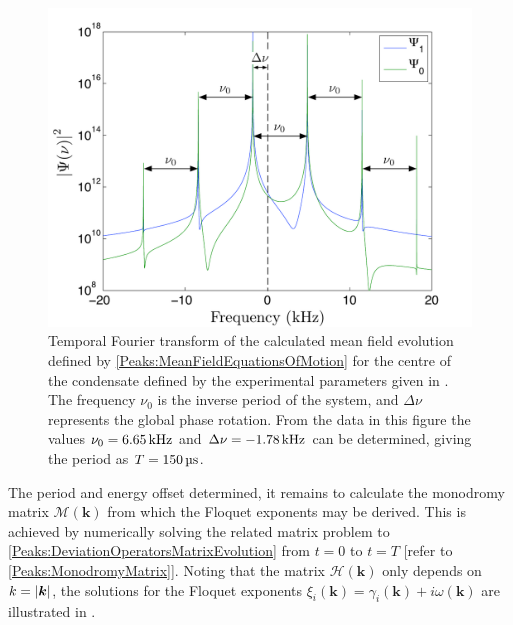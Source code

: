 \begin{figure}
    \centering
    \includegraphics[width=14cm]{MeanFieldFourierTransform}
    \caption{\label{Peaks:MeanFieldFourierTransform} Temporal Fourier transform of the calculated mean field evolution defined by \eqref{Peaks:MeanFieldEquationsOfMotion} for the centre of the condensate defined by the experimental parameters given in . The frequency $\nu_0$ is the inverse period of the system, and $\Delta\nu$ represents the global phase rotation. From the data in this figure the values $\nu_0 = \unit[6.65]{kHz}$ and $\Delta\nu = \unit[-1.78]{kHz}$ can be determined, giving the period as $T=\unit[150]{\micro{}s}$.}
\end{figure}

The period and energy offset determined, it remains to calculate the mono\-dromy matrix $\mathcal{M}(\bm{k})$ from which the Floquet exponents may be derived. This is achieved by numerically solving the related matrix problem to \eqref{Peaks:DeviationOperatorsMatrixEvolution} from $t=0$ to $t=T$ [refer to \eqref{Peaks:MonodromyMatrix}]. Noting that the matrix $\mathcal{H}(\bm{k})$ only depends on $k = \left|\bm{k}\right|$, the solutions for the Floquet exponents $\xi_i(\bm{k}) = \gamma_i(\bm{k}) + i\omega(\bm{k})$ are illustrated in . 

